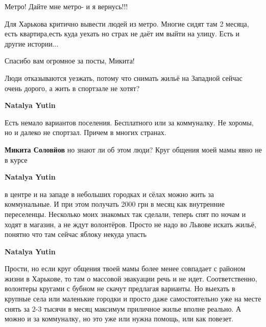  
 
 
 
 
\zzSecCmt

\begin{itemize} %
Метро! Дайте мне метро- и я вернусь!!!


Для Харькова критично вывести людей из метро. Многие сидят там 2 месяца, есть
квартира,есть куда уехать но страх не даёт им выйти на улицу. Есть и другие
истории...

Спасибо вам огромное за посты, Микита!


Люди отказываются уезжать, потому что снимать жильё на Западной сейчас очень
дорого, а жить в спортзале не хотят?

\begin{itemize} %
\textbf{Natalya Yutin} 

Есть немало вариантов поселения. Бесплатного или за коммуналку. Не хоромы, но и
далеко не спортзал. Причем в многих странах.

\textbf{Микита Соловйов} но знают ли об этом люди? Круг общения моей мамы явно не в курсе

\textbf{Natalya Yutin} 

в центре и на западе в небольших городках и сёлах можно жить за коммунальные. И
при этом получать 2000 грн в месяц как внутренние переселенцы. Несколько моих
знакомых так сделали, теперь спят по ночам и ходят в магазин, а не ждут
волонтёров. Просто не надо во Львове искать жильё, понятно что там сейчас
яблоку некуда упасть

\textbf{Natalya Yutin} 

Прости, но если круг общения твоей мамы более менее совпадает с районом жизни в
Харькове, то там о массовой эвакуации речь и не идет. Соответственно, волонтеры
кругами с бубном не скачут предлагая варианты. Но выехать в крупные села или
маленькие городки и просто даже самостоятельно уже на месте снять за 2-3 тысячи
в месяц максимум приличное жилье вполне реально. А можно и за коммуналку, но
это уже или нужна помощь, или как повезет.


\end{itemize}
\end{itemize}
